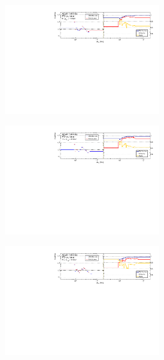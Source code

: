 \begin{figure}[htb]
    \begin{subfigure}{.99\textwidth}\centering
        \includegraphics[width = 0.75\textwidth]{Figures/m4l/UnfoldingStudies/v014_inputs/m4l_pt4l0-10inputs.pdf}
    \end{subfigure}
    \begin{subfigure}{.99\textwidth}\centering
        \includegraphics[width = 0.75\textwidth]{Figures/m4l/UnfoldingStudies/v014_inputs/m4l_pt4l10-20inputs.pdf}
    \end{subfigure}
    \begin{subfigure}{.99\textwidth}\centering
        \includegraphics[width = 0.75\textwidth]{Figures/m4l/UnfoldingStudies/v014_inputs/m4l_pt4l20-50inputs.pdf}

\end{subfigure}
\end{figure}
